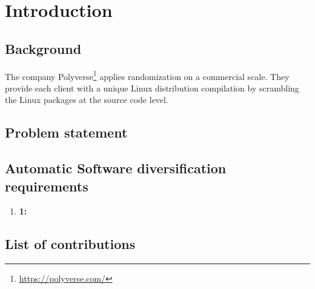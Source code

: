 
\chapter{Introduction}
\label{Intro}







\section{Background}

The company Polyverse\footnote{\url{https://polyverse.com/}} applies randomization on a commercial scale. 
They provide each client with a unique Linux distribution compilation by scrambling the Linux packages at the source code level. 




\section{Problem statement}


\section{Automatic Software diversification requirements}

\begin{enumerate}
	\item \textbf{1:} 
\end{enumerate}

\section{List of contributions}


